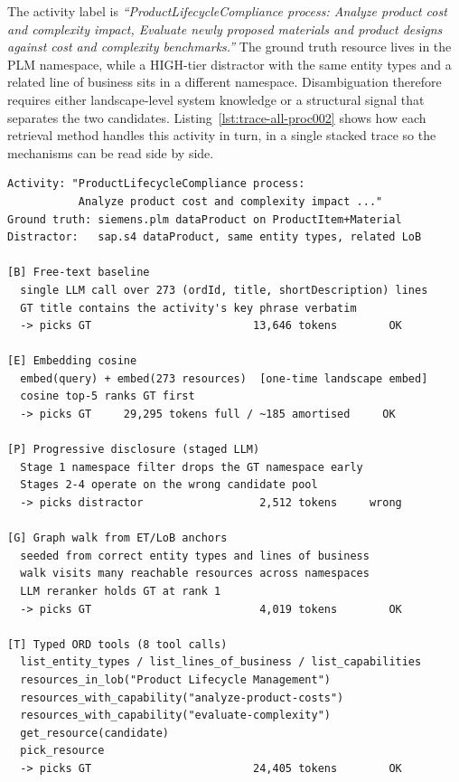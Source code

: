 The activity label is \emph{``ProductLifecycleCompliance process: Analyze product cost and complexity impact, Evaluate newly proposed materials and product designs against cost and complexity benchmarks.''} The ground truth resource lives in the PLM namespace, while a HIGH-tier distractor with the same entity types and a related line of business sits in a different namespace. Disambiguation therefore requires either landscape-level system knowledge or a structural signal that separates the two candidates. Listing~\ref{lst:trace-all-proc002} shows how each retrieval method handles this activity in turn, in a single stacked trace so the mechanisms can be read side by side.

\begin{lstlisting}[float=!t, floatplacement=!t, basicstyle=\ttfamily\scriptsize, breaklines=true, frame=single, label={lst:trace-all-proc002}, caption={All retrieval methods on \texttt{proc\_002\_s01}. Reading top to bottom shows the progression from free text (Baseline, Embedding) through progressive structure (Progressive), graph walk (Graph), typed tools (Tools), file-level agent (Raw), to the hybrid composite (Hybrid).}]
Activity: "ProductLifecycleCompliance process:
           Analyze product cost and complexity impact ..."
Ground truth: siemens.plm dataProduct on ProductItem+Material
Distractor:   sap.s4 dataProduct, same entity types, related LoB

[B] Free-text baseline
  single LLM call over 273 (ordId, title, shortDescription) lines
  GT title contains the activity's key phrase verbatim
  -> picks GT                         13,646 tokens        OK

[E] Embedding cosine
  embed(query) + embed(273 resources)  [one-time landscape embed]
  cosine top-5 ranks GT first
  -> picks GT     29,295 tokens full / ~185 amortised     OK

[P] Progressive disclosure (staged LLM)
  Stage 1 namespace filter drops the GT namespace early
  Stages 2-4 operate on the wrong candidate pool
  -> picks distractor                  2,512 tokens     wrong

[G] Graph walk from ET/LoB anchors
  seeded from correct entity types and lines of business
  walk visits many reachable resources across namespaces
  LLM reranker holds GT at rank 1
  -> picks GT                          4,019 tokens        OK

[T] Typed ORD tools (8 tool calls)
  list_entity_types / list_lines_of_business / list_capabilities
  resources_in_lob("Product Lifecycle Management")
  resources_with_capability("analyze-product-costs")
  resources_with_capability("evaluate-complexity")
  get_resource(candidate)
  pick_resource
  -> picks GT                         24,405 tokens        OK


\end{lstlisting}
